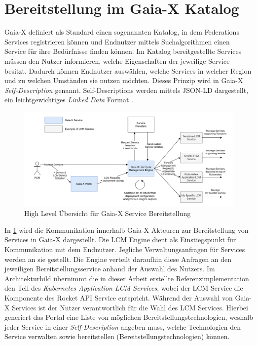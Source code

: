 \section{Bereitstellung im Gaia-X Katalog}
\label{sec:gaia-x-einbettung:gaia-x-katalog}
Gaia-X definiert als Standard einen sogenannten Katalog, in dem Federations Services registrieren können
und Endnutzer mittels Suchalgorithmen einen Service für ihre Bedürfnisse finden können.
Im Katalog bereitgestellte Services müssen den Nutzer informieren, welche Eigenschaften der jeweilige Service besitzt.
Dadurch können Endnutzer auswählen, welche Services in welcher Region und zu welchen Umständen sie nutzen möchten.
Dieses Prinzip wird in Gaia-X \emph{Self-Description} genannt. Self-Descriptions werden mittels JSON-LD dargestellt, ein
leichtgewichtiges \emph{Linked Data} Format \cite{Eggers2020}.

\begin{figure}
  \centering
  \includegraphics[width=\textwidth]{gfx/chapters/4_gaia-X/orchestration_overview.png}
  \caption{High Level Übersicht für Gaia-X Service Bereitstellung}
  \label{fig:gaia-x-orchestration-overview}
\end{figure}

In \ref{fig:gaia-x-orchestration-overview} wird die Kommunikation innerhalb Gaia-X Akteuren
zur Bereitstellung von Services in Gaia-X dargestellt.
Die \ac{LCM} Engine dient als Einstiegspunkt für Kommunikation mit dem Endnutzer. Jegliche Verwaltungsanfragen
für Services werden an sie gestellt. Die Engine verteilt daraufhin diese Anfragen
an den jeweiligen Bereitstellungsservice anhand der Auswahl des Nutzers.
Im Architekturbild übernimmt die in dieser Arbeit erstellte Referenzimplementation
den Teil des \emph{Kubernetes Application LCM Services}, wobei der \ac{LCM} Service die
Komponente des Rocket API Service entspricht.
Während der Auswahl von Gaia-X Services ist der Nutzer verantwortlich für die Wahl des \ac{LCM} Services.
Hierbei generiert das Portal eine Liste von möglichen Bereitstellungstechnologien,
weshalb jeder Service in einer \emph{Self-Description} angeben muss, welche Technologien den Service
verwalten sowie bereitstellen (Bereitstellungstechnologien) können.

